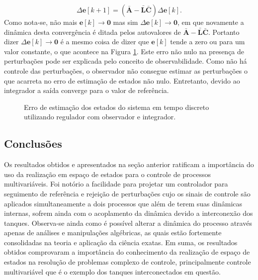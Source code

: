 \begin{equation}
    \label{eq:erro-da-estimacao-de-estados-com-observador-e-integrador}
    \Delta \mathbf{e}[k+1] =
    (\mathbf{\bar{A}} - \mathbf{\bar{L}}\mathbf{\bar{C}}) \Delta \mathbf{e}[k]
    \text{.}
\end{equation} Como nota-se, não mais $\mathbf{e}[k] \rightarrow \mathbf{0}$
mas sim $\Delta \mathbf{e}[k] \rightarrow \mathbf{0}$, em que novamente a
dinâmica desta convergência é ditada pelos autovalores de $\mathbf{\bar{A}} -
\mathbf{\bar{L}}\mathbf{\bar{C}}$. Portanto dizer $\Delta \mathbf{e}[k]
\rightarrow \mathbf{0}$ é a mesmo coisa de dizer que $\mathbf{e}[k]$ tende a
zero ou para um valor constante, o que acontece na Figura
\ref{fig:erro-de-estimacao-de-estados-com-observador-e-integrador}. Este erro
não nulo na presença de perturbações pode ser explicada pelo conceito de
observabilidade. Como não há controle das perturbações, o observador não
consegue estimar as perturbações o que acarreta no erro de estimação de estados
não nulo. Entretanto, devido ao integrador a saída converge para o valor de
referência.

\begin{figure}[!ht]
    \caption{Erro de estimação dos estados do sistema em tempo discreto
    utilizando regulador com observador e integrador.}
    \vspace{-10pt}
    \hspace{-30pt}
    \label{fig:erro-de-estimacao-de-estados-com-observador-e-integrador}
    \begin{minipage}{\linewidth}
        
    \end{minipage}
\end{figure}

\subsection{Conclusões}

Os resultados obtidos e apresentados na seção anterior ratificam a importância
do uso da realização em espaço de estados para o controle de processos
multivariáveis. Foi notório a facilidade para projetar um controlador para
seguimento de referência e rejeição de perturbações cujo os sinais de controle
são aplicados simultaneamente a dois processos que além de terem suas dinâmicas
internas, sofrem ainda com o acoplamento da dinâmica devido a interconexão dos
tanques. Observa-se ainda como é possível alterar a dinâmica do processo através
apenas de análises e manipulações algébricas, as quais estão fortemente
consolidadas na teoria e aplicação da ciência exatas. Em suma, os resultados
obtidos comprovaram a importância do conhecimento da realização de espaço de
estados na resolução de problemas complexo de controle, principalmente controle
multivariável que é o exemplo dos tanques interconectados em questão.
